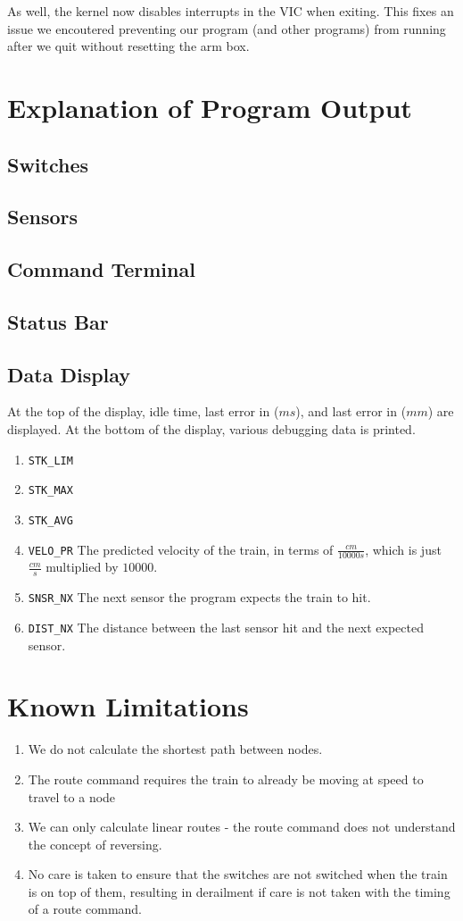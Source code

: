 \documentclass{article}
\begin{document}
    As well, the kernel now disables interrupts in the VIC when exiting. This fixes an issue we encoutered preventing our program (and other programs) from running after we quit without resetting the arm box.
\section{Explanation of Program Output}
\subsection{Switches}
\subsection{Sensors}
\subsection{Command Terminal}
\subsection{Status Bar}
\subsection{Data Display}
At the top of the display, idle time, last error in ($ms$), and last error in ($mm$) are displayed.
At the bottom of the display, various debugging data is printed.\\
\begin{enumerate}
    \item{\verb|STK_LIM|} %
    \item{\verb|STK_MAX|}
    \item{\verb|STK_AVG|}
    \item{\verb|VELO_PR|} The predicted velocity of the train, in terms of $ \frac{cm}{10000s}$, which is just $\frac{cm}{s}$ multiplied by $10000$.
    \item{\verb|SNSR_NX|} The next sensor the program expects the train to hit.
    \item{\verb|DIST_NX|} The distance between the last sensor hit and the next expected sensor.
\end{enumerate}

\section{Known Limitations}
\begin{enumerate}
\item We do not calculate the shortest path between nodes.
\item The route command requires the train to already be moving at speed to travel to a node
\item We can only calculate linear routes - the route command does not understand the concept of reversing.
\item No care is taken to ensure that the switches are not switched when the train is on top of them, resulting in derailment if care is not taken with the timing of a route command.

\end{enumerate}
\end{document}
